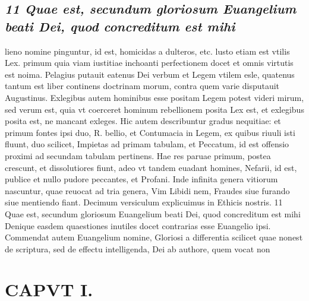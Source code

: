 \documentclass{article}
\begin{document}
\begin{pages}
\subsection*{\textit{11 Quae est, secundum gloriosum Euangelium beati Dei, quod concreditum est mihi}}lieno nomine pinguntur, id est, homicidas a dulteros, etc. lusto etiam est vtilis Lex. primum quia viam iustitiae inchoanti perfectionem docet et omnis virtutis est noima. Pelagius putauit eatenus Dei verbum et Legem vtilem esle, quatenus tantum est liber continens doctrinam morum, contra quem varie disputauit Augustinus. Exlegibus autem hominibus esse positam Legem potest videri mirum, sed verum est, quia vt coerceret hominum rebellionem posita Lex est, et exlegibus posita est, ne mancant exleges. Hic autem describuntur gradus nequitiae: et primum fontes ipsi duo, R. bellio, et Contumacia in Legem, ex quibus riuuli isti fluunt, duo scilicet, Impietas ad primam tabulam, et Peccatum, id est offensio proximi ad secundam tabulam pertinens. Hae res paruae primum, postea crescunt, et dissolutiores fiunt, adeo vt tandem euadant homines, Nefarii, id est, publice et nullo pudore peccantes, et Profani. Inde infinita genera vitiorum nascuntur, quae reuocat ad tria genera, Vim Libidi nem, Fraudes siue furando siue mentiendo fiant. Decimum versiculum explicuimus in Ethicis nostris. 11 Quae est, secundum gloriosum Euangelium beati Dei, quod concreditum est mihi Denique easdem quaestiones inutiles docet contrarias esse Euangelio ipsi. Commendat autem Euangelium nomine, Gloriosi a differentia scilicet quae nonest de scriptura, sed de effectu intelligenda, Dei ab authore, quem vocat non  \pend
\section*{CAPVT  I. }
\marginpar{[ p.23 ]}\pstart {}
{}

\end{pages}
\end{document}
